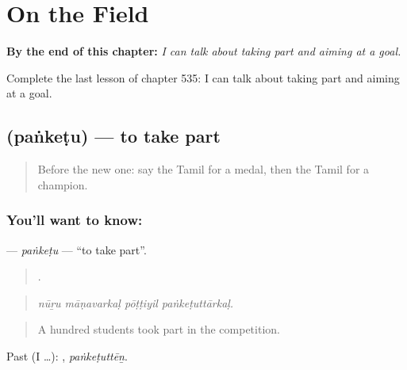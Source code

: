 
\chapter{On the Field}
\label{ch:ta-on-the-field}

\begin{chapteropening}
\textbf{By the end of this chapter:} \emph{I can talk about taking part and aiming at a goal.}

Complete the last lesson of chapter 535: I can talk about taking part and aiming at a goal.
\end{chapteropening}

\section[\texorpdfstring{\ta{பங்கெடு} (paṅkeṭu)}{பங்கெடு (paṅkeṭu)}]{ (paṅkeṭu) — to take part}

\label{lesson:TA-C535-panketu}



\begin{quote}
Before the new one: say the Tamil for a medal, then the Tamil for a champion.
\end{quote}

\subsection*{You'll want to know: }
\textbf{} — \emph{paṅkeṭu} — \textquotedblleft{}to take part\textquotedblright{}.

\begin{quote}
   .
\end{quote}

\begin{quote}
\emph{nūṟu māṇavarkaḷ pōṭṭiyil paṅkeṭuttārkaḷ.}
\end{quote}

\begin{quote}
A hundred students took part in the competition.
\end{quote}

Past (I …): , \emph{paṅkeṭuttēṉ}.

